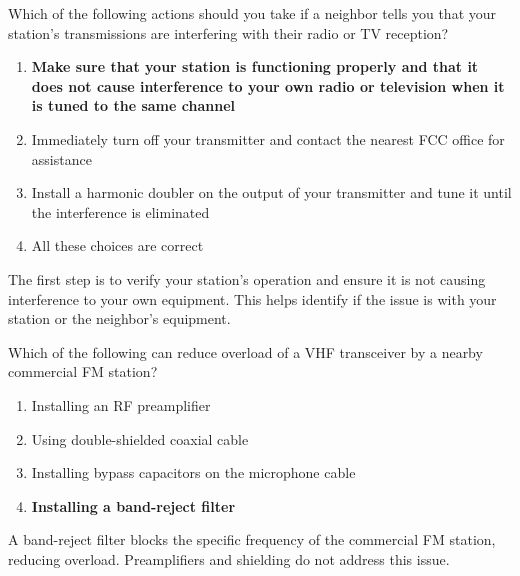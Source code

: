 \begin{tcolorbox}[colback=gray!10!white,colframe=black!75!black,title={T7B06}]
    Which of the following actions should you take if a neighbor tells you that your station’s transmissions are interfering with their radio or TV reception?
    \begin{enumerate}[label=\Alph*,noitemsep]
        \item \textbf{Make sure that your station is functioning properly and that it does not cause interference to your own radio or television when it is tuned to the same channel}
        \item Immediately turn off your transmitter and contact the nearest FCC office for assistance
        \item Install a harmonic doubler on the output of your transmitter and tune it until the interference is eliminated
        \item All these choices are correct
    \end{enumerate}
\end{tcolorbox}
The first step is to verify your station's operation and ensure it is not causing interference to your own equipment. This helps identify if the issue is with your station or the neighbor's equipment.


\begin{tcolorbox}[colback=gray!10!white,colframe=black!75!black,title={T7B07}]
    Which of the following can reduce overload of a VHF transceiver by a nearby commercial FM station?
    \begin{enumerate}[label=\Alph*,noitemsep]
        \item Installing an RF preamplifier
        \item Using double-shielded coaxial cable
        \item Installing bypass capacitors on the microphone cable
        \item \textbf{Installing a band-reject filter}
    \end{enumerate}
\end{tcolorbox}
A band-reject filter blocks the specific frequency of the commercial FM station, reducing overload. Preamplifiers and shielding do not address this issue.


